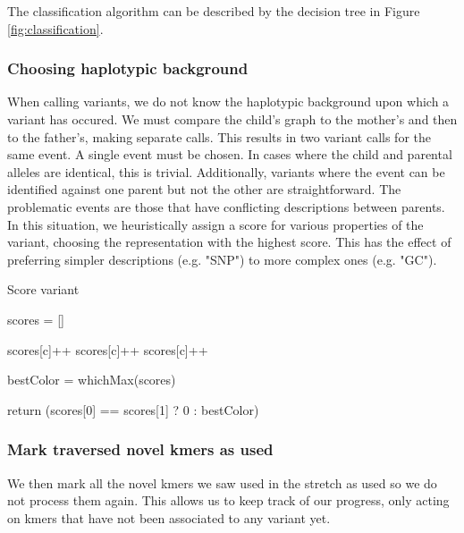 The classification algorithm can be described by the decision tree in Figure \ref{fig:classification}.

\subsubsection{Choosing haplotypic background}

When calling variants, we do not know the haplotypic background upon which a variant has occured.  We must compare the child's graph to the mother's and then to the father's, making separate calls.  This results in two variant calls for the same event.  A single event must be chosen.  In cases where the child and parental alleles are identical, this is trivial.  Additionally, variants where the event can be identified against one parent but not the other are straightforward.  The problematic events are those that have conflicting descriptions between parents.  In this situation, we heuristically assign a score for various properties of the variant, choosing the representation with the highest score.  This has the effect of preferring simpler descriptions (e.g. "SNP") to more complex ones (e.g. "GC").

\begin{algorithm}
\caption{Score variant}
\label{alg:scoreVariant}
\begin{algorithmic}[1]
    \State scores = []

            \State scores[c]++
        \EndIf
            \State scores[c]++
        \EndIf
            \State scores[c]++
        \EndIf
    \EndFor

    \State bestColor = whichMax(scores)

    \State return (scores[0] == scores[1] ? 0 : bestColor)
\EndFunction
\end{algorithmic}
\end{algorithm}

\subsubsection{Mark traversed novel kmers as used}

We then mark all the novel kmers we saw used in the stretch as used so we do not process them again.  This allows us to keep track of our progress, only acting on kmers that have not been associated to any variant yet.

